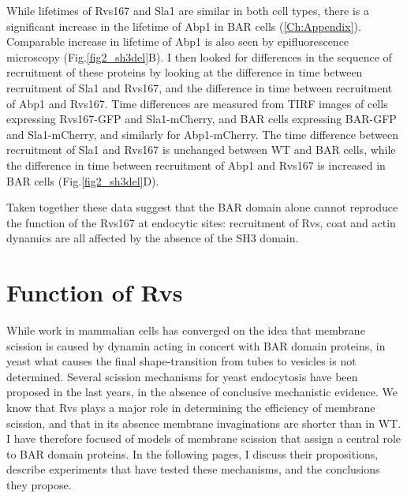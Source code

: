 \vspace{5mm}
\newpage
While lifetimes of Rvs167 and Sla1 are similar in both cell types, there is a significant increase in the lifetime of Abp1 in BAR cells (\ref{Ch:Appendix}). Comparable increase in lifetime of Abp1 is also seen by epifluorescence microscopy (Fig.\ref{fig2_sh3del}B). I then looked for differences in the sequence of recruitment of these proteins by looking at the difference in time between recruitment of Sla1 and Rvs167, and the difference in time between recruitment of Abp1 and Rvs167. Time differences are measured from TIRF images of cells expressing  Rvs167-GFP and Sla1-mCherry, and BAR cells expressing BAR-GFP and Sla1-mCherry, and similarly for Abp1-mCherry. The time difference between recruitment of Sla1 and Rvs167 is unchanged between WT and BAR cells, while the difference in time between recruitment of Abp1 and Rvs167 is increased in BAR cells  (Fig.\ref{fig2_sh3del}D).

	\vspace{5mm}
Taken together these data suggest that the BAR domain alone cannot reproduce the function of the Rvs167 at endocytic sites: recruitment of Rvs, coat and actin dynamics are all affected by the absence of the SH3 domain. 

\newpage
		
\section{Function of Rvs}
\label{scisson_models}

While work in mammalian cells has converged on the idea that membrane scission is caused by dynamin acting in concert with BAR domain proteins, in yeast what causes the final shape-transition from tubes to vesicles is not determined. Several scission mechanisms for yeast endocytosis have been proposed in the last years, in the absence of conclusive mechanistic evidence. We know that Rvs plays a major role in determining the efficiency of membrane scission, and that in its absence membrane invaginations are shorter than in WT. I have therefore focused of models of membrane scission that assign a central role to BAR domain proteins. In the following pages, I discuss their propositions, describe experiments that have tested these mechanisms, and the conclusions they propose. 


